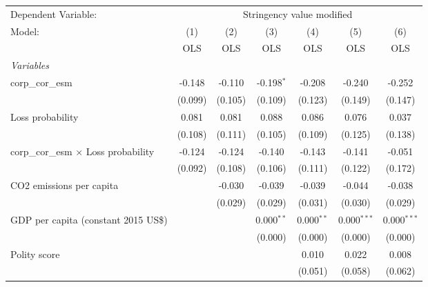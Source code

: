
\begingroup
\centering
\begin{tabular}{lcccccc}
   \toprule
   Dependent Variable: & \multicolumn{6}{c}{Stringency value modified}\\
   Model:                                      & (1)     & (2)     & (3)          & (4)          & (5)           & (6)\\  
                                               &  OLS    & OLS     & OLS          & OLS          & OLS           & OLS\\  
   \midrule
   \emph{Variables}\\
   corp\_cor\_esm                              & -0.148  & -0.110  & -0.198$^{*}$ & -0.208       & -0.240        & -0.252\\   
                                               & (0.099) & (0.105) & (0.109)      & (0.123)      & (0.149)       & (0.147)\\   
   Loss probability                            & 0.081   & 0.081   & 0.088        & 0.086        & 0.076         & 0.037\\   
                                               & (0.108) & (0.111) & (0.105)      & (0.109)      & (0.125)       & (0.138)\\   
   corp\_cor\_esm $\times$ Loss probability    & -0.124  & -0.124  & -0.140       & -0.143       & -0.141        & -0.051\\   
                                               & (0.092) & (0.108) & (0.106)      & (0.111)      & (0.122)       & (0.172)\\   
   CO2 emissions per capita                    &         & -0.030  & -0.039       & -0.039       & -0.044        & -0.038\\   
                                               &         & (0.029) & (0.029)      & (0.031)      & (0.030)       & (0.029)\\   
   GDP per capita (constant 2015 US\$)         &         &         & 0.000$^{**}$ & 0.000$^{**}$ & 0.000$^{***}$ & 0.000$^{***}$\\   
                                               &         &         & (0.000)      & (0.000)      & (0.000)       & (0.000)\\   
   Polity score                                &         &         &              & 0.010        & 0.022         & 0.008\\   
                                               &         &         &              & (0.051)      & (0.058)       & (0.062)\\   

\end{tabular}
